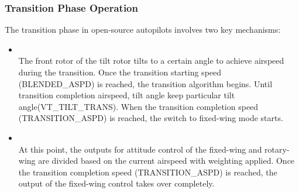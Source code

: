 \documentclass[journal,article,submit,pdftex,moreauthors]{Definitions/mdpi}
\begin{document}
\subsubsection{Transition Phase Operation}
The transition phase in open-source autopilots involves two key mechanisms:
\begin{itemize}
    \item {} \\
    The front rotor of the tilt rotor tilts to a certain angle to achieve airspeed during the transition. Once the transition starting speed (BLENDED\_ASPD) is reached, the transition algorithm begins. Until transition completion airspeed, tilt angle keep particular tilt angle(VT\_TILT\_TRANS). When the transition completion speed (TRANSITION\_ASPD) is reached, the switch to fixed-wing mode starts.
    \item {} \\
    At this point, the outputs for attitude control of the fixed-wing and rotary-wing are divided based on the current airspeed with weighting applied. Once the transition completion speed (TRANSITION\_ASPD) is reached, the output of the fixed-wing control takes over completely.
\end{itemize}
\end{document}
